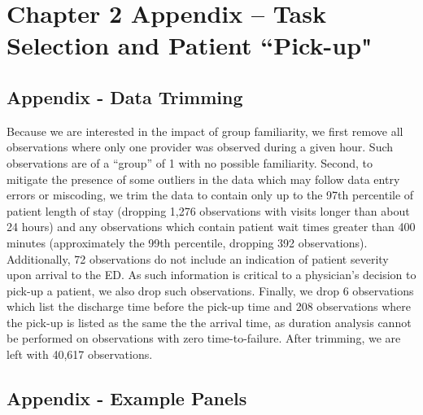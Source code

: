 \chapter{Chapter 2 Appendix -- Task Selection and Patient ``Pick-up"}

\section{Appendix - Data Trimming} \label{app_pu_Trim}
 Because we are interested in the impact of group familiarity, we first remove all observations where only one provider was observed during a given hour. Such observations are of a “group” of 1 with no possible familiarity. Second, to mitigate the presence of some outliers in the data which may follow data entry errors or miscoding, we trim the data to contain only up to the 97th percentile of patient length of stay (dropping 1,276 observations with visits longer than about 24 hours) and any observations which contain patient wait times greater than 400 minutes (approximately the 99th percentile, dropping 392 observations). Additionally, 72 observations do not include an indication of patient severity upon arrival to the ED. As such information is critical to a physician’s decision to pick-up a patient, we also drop such observations. Finally, we drop 6 observations which list the discharge time before the pick-up time and 208 observations where the pick-up is listed as the same the the arrival time, as duration analysis cannot be performed on observations with zero time-to-failure. After trimming, we are left with 40,617 observations. 
 

\section{Appendix - Example Panels} \label{app_pu_examples}

